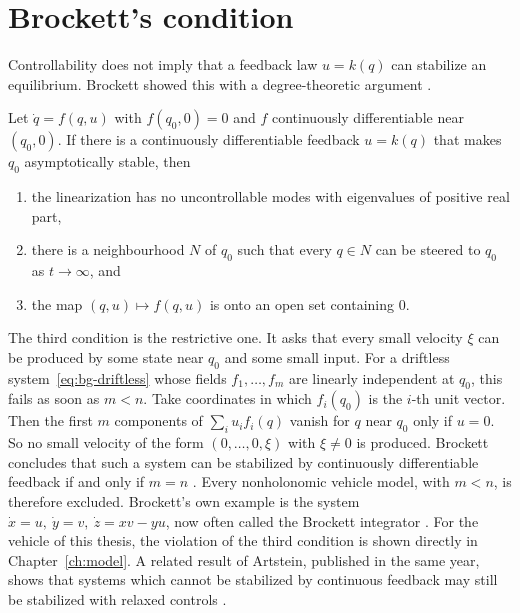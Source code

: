 \section{Brockett's condition}
\label{sec:bg-brockett}

Controllability does not imply that a feedback law $u=k(q)$ can stabilize an
equilibrium. Brockett showed this with a degree-theoretic argument
\cite{brockett1983}.

\begin{theorem}
\label{thm:brockett}
Let $\dot q=f(q,u)$ with $f(q_0,0)=0$ and $f$ continuously differentiable near
$(q_0,0)$. If there is a continuously differentiable feedback $u=k(q)$ that
makes $q_0$ asymptotically stable, then
\begin{enumerate}
  \item the linearization has no uncontrollable modes with eigenvalues of
        positive real part,
  \item there is a neighbourhood $N$ of $q_0$ such that every $q\in N$ can be
        steered to $q_0$ as $t\to\infty$, and
  \item the map $(q,u)\mapsto f(q,u)$ is onto an open set containing $0$.
\end{enumerate}
\end{theorem}

The third condition is the restrictive one. It asks that every small velocity
$\xi$ can be produced by some state near $q_0$ and some small input. For a
driftless system~\eqref{eq:bg-driftless} whose fields $f_1,\dots,f_m$ are
linearly independent at $q_0$, this fails as soon as $m<n$. Take coordinates in
which $f_i(q_0)$ is the $i$-th unit vector. Then the first $m$ components of
$\sum_iu_if_i(q)$ vanish for $q$ near $q_0$ only if $u=0$. So no small velocity
of the form $(0,\dots,0,\xi)$ with $\xi\neq0$ is produced. Brockett concludes
that such a system can be stabilized by continuously differentiable feedback if
and only if $m=n$ \cite{brockett1983}. Every nonholonomic vehicle model, with
$m<n$, is therefore excluded. Brockett's own example is the system
$\dot x=u,\ \dot y=v,\ \dot z=xv-yu$, now often called the Brockett
integrator \cite{brockett1983}. For the vehicle of this thesis, the violation of
the third condition is shown directly in Chapter~\ref{ch:model}. A related
result of Artstein, published in the same year, shows that systems which
cannot be stabilized by continuous feedback may still be stabilized with
relaxed controls \cite{artstein1983}.

